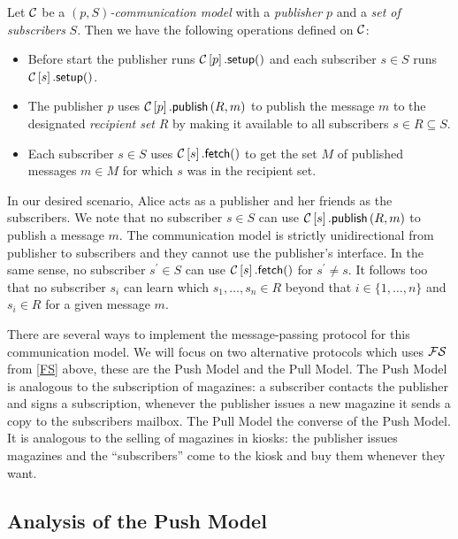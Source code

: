 \begin{definition}\label{CommunicationModel}
  Let \(\operatorname{\mathcal{C}}\) be a \emph{\((p, S)\)-communication model} with a \emph{publisher} 
  \(p\) and a \emph{set of subscribers} \(S\).
  Then we have the following operations defined on \(\operatorname{\mathcal{C}}\):
  \begin{itemize}
    \item Before start the publisher runs \(\csetup{p}\) and each subscriber 
      \(s\in S\) runs \(\csetup{s}\).
    \item The publisher \(p\) uses \(\operatorname{\mathcal{C}}\left[ p \right].\mathsf{publish}\left( R, m \right)\) to publish the message 
      \(m\) to the designated \emph{recipient set} \(R\) by making it available 
      to all subscribers \(s\in R\subseteq S\).
    \item Each subscriber \(s\in S\) uses \(\operatorname{\mathcal{C}}\left[ s \right].\mathsf{fetch}()\) to get the set \(M\) of 
      published messages \(m\in M\) for which \(s\) was in the recipient set.
  \end{itemize}
\end{definition}

In our desired scenario, Alice acts as a publisher and her friends as the 
subscribers.
We note that no subscriber \(s\in S\) can use \(\operatorname{\mathcal{C}}\left[ s \right].\mathsf{publish}\left( R, m \right)\) to publish 
a message \(m\).
The communication model is strictly unidirectional from publisher to 
subscribers and they cannot use the publisher's interface.
In the same sense, no subscriber \(s^\prime\in S\) can use \(\operatorname{\mathcal{C}}\left[ s \right].\mathsf{fetch}()\) for 
\(s^\prime\neq s\).
It follows too that no subscriber \(s_i\) can learn which \(s_1, \ldots, s_n\in 
  R\) beyond that \(i\in \{1, \ldots, n\}\) and \(s_i\in R\) for a given 
message \(m\).

There are several ways to implement the message-passing protocol for this 
communication model.
We will focus on two alternative protocols which uses \(\operatorname{\mathcal{FS}}\) from \cref{FS} 
above, these are the Push Model and the Pull Model.
The Push Model is analogous to the subscription of magazines:
a subscriber contacts the publisher and signs a subscription, whenever the 
publisher issues a new magazine it sends a copy to the subscribers mailbox.
The Pull Model the converse of the Push Model.
It is analogous to the selling of magazines in kiosks:
the publisher issues magazines and the \enquote{subscribers} come to the kiosk 
and buy them whenever they want.

\subsection{Analysis of the Push Model}

